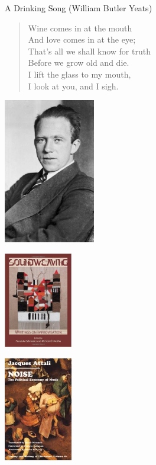 \documentclass{beamer}
\begin{document}
\begin{frame}

  \begin{center}
    \color{white} A Drinking Song (William Butler Yeats)
  \end{center}

    \begin{verse}
      \begin{center}
        Wine comes in at the mouth\\
        And love comes in at the eye;\\
        That’s all we shall know for truth\\
        Before we grow old and die.\\
        I lift the glass to my mouth,\\
        I look at you, and I sigh.
      \end{center}
    \end{verse}
\end{frame}

\begin{frame}
  \begin{center}
    \vspace{.2cm}
    \includegraphics[width=4cm]{./img/heisenberg.jpg}
  \end{center}
\end{frame}

\begin{frame}
  \begin{center}
    \includegraphics[width=3cm]{./img/soundweaving.jpg}
  \end{center}
\end{frame}

\begin{frame}
  \begin{center}
    \includegraphics[width=3cm]{./img/noise.jpg}
  \end{center}
\end{frame}
\end{document}
